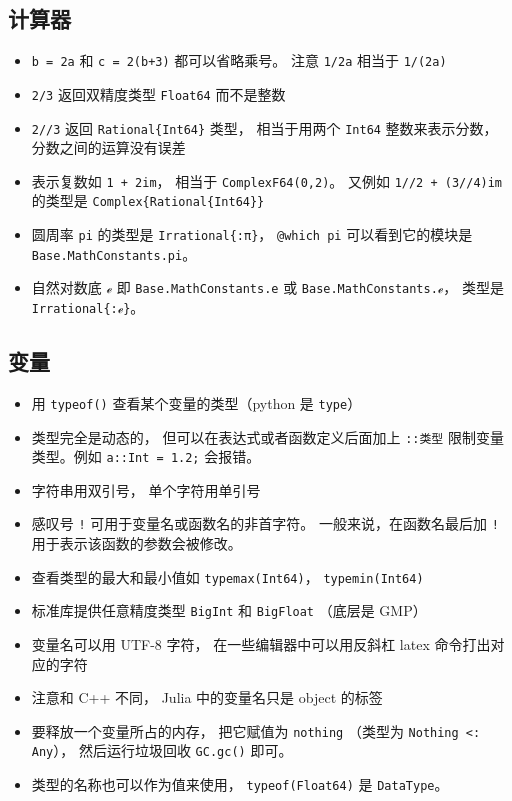 \subsection{计算器}
\begin{itemize}
\item \verb`b = 2a` 和 \verb`c = 2(b+3)` 都可以省略乘号。 注意 \verb`1/2a` 相当于 \verb`1/(2a)`
\item \verb`2/3` 返回双精度类型 \verb`Float64` 而不是整数
\item \verb`2//3` 返回 \verb`Rational{Int64}` 类型， 相当于用两个 \verb`Int64` 整数来表示分数， 分数之间的运算没有误差
\item 表示复数如 \verb`1 + 2im`， 相当于 \verb`ComplexF64(0,2)`。 又例如 \verb`1//2 + (3//4)im` 的类型是 \verb`Complex{Rational{Int64}}`
\item 圆周率 \verb`pi` 的类型是 \verb`Irrational{:π}`， \verb`@which pi` 可以看到它的模块是 \verb`Base.MathConstants.pi`。
\item 自然对数底 \verb`ℯ` 即 \verb`Base.MathConstants.e` 或 \verb`Base.MathConstants.ℯ`， 类型是 \verb`Irrational{:ℯ}`。
\end{itemize}

\subsection{变量}
\begin{itemize}
\item 用 \verb`typeof()` 查看某个变量的类型（python 是 \verb`type`）
\item 类型完全是动态的， 但可以在表达式或者函数定义后面加上 \verb`::类型` 限制变量类型。例如 \verb`a::Int = 1.2;` 会报错。
\item 字符串用双引号， 单个字符用单引号
\item 感叹号 \verb`!` 可用于变量名或函数名的非首字符。 一般来说，在函数名最后加 \verb`!` 用于表示该函数的参数会被修改。
\item 查看类型的最大和最小值如 \verb`typemax(Int64)`， \verb`typemin(Int64)`
\item 标准库提供任意精度类型 \verb`BigInt` 和 \verb`BigFloat` （底层是 GMP）
\item 变量名可以用 UTF-8 字符， 在一些编辑器中可以用反斜杠 latex 命令打出对应的字符
\item 注意和 C++ 不同， Julia 中的变量名只是 object 的标签
\item 要释放一个变量所占的内存， 把它赋值为 \verb`nothing` （类型为 \verb`Nothing <: Any`）， 然后运行垃圾回收 \verb`GC.gc()` 即可。
\item 类型的名称也可以作为值来使用， \verb`typeof(Float64)` 是 \verb`DataType`。
\end{itemize}

